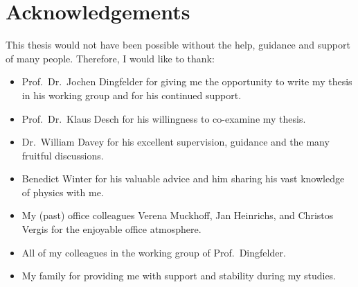 \chapter{Acknowledgements}
\label{sec:ack}

This thesis would not have been possible without the help, guidance and support
of many people. Therefore, I would like to thank:
\begin{itemize}
\item Prof.\ Dr.\ Jochen Dingfelder for giving me the opportunity to write my
  thesis in his working group and for his continued support.

\item Prof.\ Dr.\ Klaus Desch for his willingness to co-examine my thesis.

\item Dr.\ William Davey for his excellent supervision, guidance and the many
  fruitful discussions.

\item Benedict Winter for his valuable advice and him sharing his vast
  knowledge of physics with me.

\item My (past) office colleagues Verena Muckhoff, Jan Heinrichs, and Christos
  Vergis for the enjoyable office atmosphere.

\item All of my colleagues in the working group of Prof.\ Dingfelder.

\item My family for providing me with support and stability during my studies.

\end{itemize}



